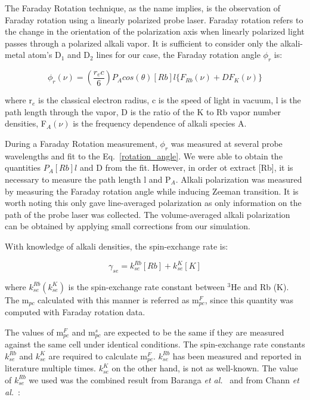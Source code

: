 The Faraday Rotation technique, as the name implies, is the observation of Faraday rotation using a linearly polarized probe laser. Faraday rotation refers to the change in the orientation of the polarization axis when linearly polarized light passes through a polarized alkali vapor. It is sufficient to consider only the alkali-metal atom's D$_{1}$ and D$_{2}$ lines for our case, the Faraday rotation angle $\phi_{r}$ is:

\begin{equation}\label{rotation_angle}
\phi_{r}(\nu)=\left(\frac{r_{e}c}{6}\right)P_{A}cos(\theta)[Rb]l\{F_{Rb}(\nu)+DF_{K}(\nu)\}
\end{equation}

where r$_{e}$ is the classical electron radius, c is the speed of light in vacuum, l is the path length through the vapor, D is the ratio of the K to Rb vapor number densities, F$_{A}(\nu)$ is the frequency dependence of alkali species A. 

During a Faraday Rotation measurement, $\phi_{r}$ was measured at several probe wavelengths and fit to the Eq.~\ref{rotation_angle}. We were able to obtain the quantities $P_{A}[Rb]l$ and D from the fit. However, in order ot extract [Rb], it is necessary to measure the path length l and P$_{A}$. Alkali polarization was measured by measuring the Faraday rotation angle while inducing Zeeman transition. It is worth noting this only gave line-averaged polarization as only information on the path of the probe laser was collected. The volume-averaged alkali polarization can be obtained by applying small corrections from our simulation.

With knowledge of alkali densities, the spin-exchange rate is:

\begin{equation}
\gamma_{se}=k_{se}^{Rb}[Rb]+k_{se}^{K}[K]
\end{equation}

where $k_{se}^{Rb}(k_{se}^{K})$ is the spin-exchange rate constant between $^{3}$He and Rb (K). The m$_{pc}$ calculated with this manner is referred as m$_{pc}^{F}$, since this quantity was computed with Faraday rotation data.

The values of m$_{pc}^{F}$ and m$_{pc}^{s}$ are expected to be the same if they are measured against the same cell under identical conditions. The spin-exchange rate constants $k_{se}^{Rb}$ and $k_{se}^{K}$ are required to calculate m$_{pc}^{F}$. $k_{se}^{Rb}$ has been measured and reported in literature multiple times. $k_{se}^{K}$ on the other hand, is not as well-known. The value of $k_{se}^{Rb}$ we used was the combined result from Baranga \emph{et al.}~\cite{PhysRevLett.80.2801} and from Chann \emph{et al.}~\cite{PhysRevA.66.032703}:

